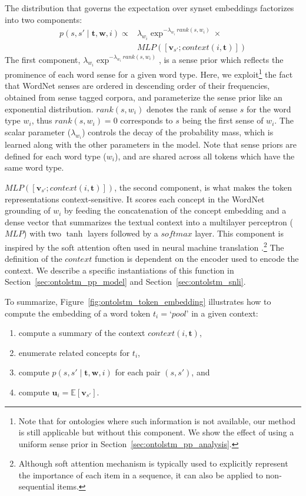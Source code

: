 The distribution that governs the expectation over synset embeddings factorizes into two components:
\begin{align}
p(s, s' \mid \boldsymbol{t}, \boldsymbol{w}, i) \propto& 
\lambda_{w_i} \exp^{-\lambda_{w_i} \  \textit{rank}(s, w_i)} \times \nonumber \\
&  \textit{MLP}( [\mathbf{v}_{s'}; \textit{context}(i, \boldsymbol{t})]) 
\label{eq:ontolstm_attention}
\end{align}
The first component, $\lambda_{w_i} \exp^{-\lambda_{w_i} \  \textit{rank}(s, w_i)}$, is a sense prior which reflects the prominence of each word sense for a given word type. Here, we exploit\footnote{Note that for ontologies where such information is not available, our method is still applicable but without this component.
We show the effect of using a uniform sense prior in Section~\ref{sec:ontolstm_pp_analysis}.} the fact that WordNet senses are ordered in descending order of their frequencies, obtained from sense tagged corpora, and parameterize the sense prior like an exponential distribution.
$rank(s, w_i)$ denotes the rank of sense $s$ for the word type $w_i$, thus $rank(s, w_i)=0$ corresponds to $s$ being the first sense of $w_i$.
The scalar parameter ($\lambda_{w_i}$) controls the decay of the probability mass, which is learned along with the other parameters in the model. Note that sense priors are defined for each word type ($w_i$), and are shared across all tokens which have the same word type.

$\textit{MLP}( [\mathbf{v}_{s'}; \textit{context}(i, \boldsymbol{t})])$, the second component, is what makes the token representations context-sensitive. 
It scores each concept in the WordNet grounding of $w_i$ by feeding the concatenation of the concept embedding and a dense vector that summarizes the textual context into a multilayer perceptron ($\textit{MLP}$) with two $\tanh$ layers followed by a $softmax$ layer.
This component is inspired by the soft attention often used in neural machine translation \citep{bahdanau:14}.\footnote{Although soft attention mechanism is typically used to explicitly represent the importance of each item in a sequence, it can also be applied to non-sequential items.} The definition of the $\textit{context}$ function is dependent on the encoder used to encode the context.
We describe a specific instantiations of this function in Section~\ref{sec:ontolstm_pp_model} and Section~\ref{sec:ontolstm_snli}.

To summarize, Figure~\ref{fig:ontolstm_token_embedding} illustrates how to compute the embedding of a word token $t_i=\textit{`pool'}$ in a given context:
\begin{enumerate}
    \item compute a summary of the context $\textit{context}(i, \boldsymbol{t})$,
    \item enumerate related concepts for $t_i$,
    \item compute $p(s,s'\mid \boldsymbol{t}, \boldsymbol{w}, i)$ for each pair $(s,s')$, and
    \item compute $\mathbf{u}_i = \mathbb{E}[\mathbf{v}_{s'}]$.
\end{enumerate}

